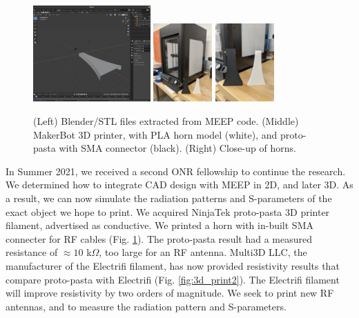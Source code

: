 \documentclass[../../main.tex]{subfiles}
\begin{document}
\begin{figure}[hb]
\centering
\includegraphics[width=0.4\textwidth]{figures/blender_example.png}
\includegraphics[width=0.2\textwidth]{figures/3dprinter.jpg}
\includegraphics[width=0.2\textwidth]{figures/3dprinter_2.jpg}
\caption{\label{fig:3d_print} (Left) Blender/STL files extracted from MEEP code.  (Middle) MakerBot 3D printer, with PLA horn model (white), and  proto-pasta with SMA connector (black). (Right) Close-up of horns.}
\end{figure}

In Summer 2021, we received a second ONR fellowship to continue the research.  We determined how to integrate CAD design with MEEP in 2D, and later 3D.  As a result, we can now simulate the radiation patterns and S-parameters of the exact object we hope to print.  We acquired NinjaTek proto-pasta 3D printer filament, advertised as conductive.  We printed a horn with in-built SMA connecter for RF cables (Fig. \ref{fig:3d_print}).  The proto-pasta result had a measured resistance of $\approx 10$ k$\Omega$, too large for an RF antenna.  Multi3D LLC, the manufacturer of the Electrifi filament, has now provided resistivity results that compare proto-pasta with Electrifi (Fig. \ref{fig:3d_print2}).  The Electrifi filament will improve resistivity by two orders of magnitude.  We seek to print new RF antennas, and to measure the radiation pattern and S-parameters. \\ \vspace{2.5mm}
\end{document}
